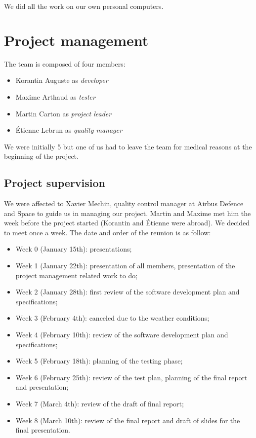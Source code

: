 \documentclass[openany, a4paper]{book}
\begin{document}
      We did all the work on our own personal computers.

  \chapter{Project management}
    The team is composed of four members:
    \begin{itemize}
      \item Korantin Auguste as \textit{developer}
      \item Maxime Arthaud as \textit{tester}
      \item Martin Carton as \textit{project leader}
      \item Étienne Lebrun as \textit{quality manager}
    \end{itemize}

    We were initially 5 but one of us had to leave the team for medical reasons
    at the beginning of the project.

    \section{Project supervision}
      We were affected to Xavier Mechin, quality control manager at Airbus
      Defence and Space to guide us in managing our project. Martin and Maxime
      met him the week before the project started (Korantin and Étienne were
      abroad). We decided to meet once a week. The date and order of the reunion
      is as follow:

      \begin{itemize}
        \item Week 0 (January 15th): presentations;
        \item Week 1 (January 22th): presentation of all members, presentation
          of the project management related work to do;
        \item Week 2 (January 28th): first review of the software development
          plan and specifications;
        \item Week 3 (February 4th): canceled due to the weather conditions;
        \item Week 4 (February 10th): review of the software development plan
          and specifications;
        \item Week 5 (February 18th): planning of the testing phase;
        \item Week 6 (February 25th): review of the test plan, planning of the
          final report and presentation;
        \item Week 7 (March 4th): review of the draft of final report;
        \item Week 8 (March 10th): review of the final report and draft of
          slides for the final presentation.
      \end{itemize}
\end{document}
